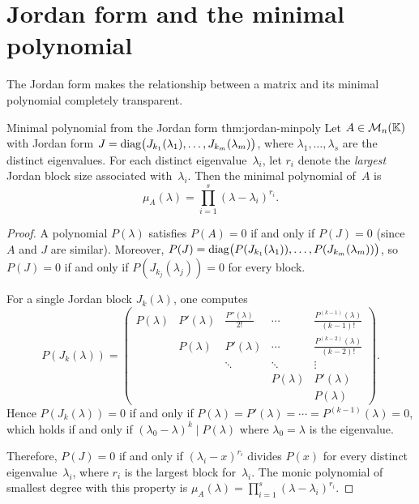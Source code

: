 \section{Jordan form and the minimal polynomial}%
\label{sec:jordan-minpoly}

The Jordan form makes the relationship between a matrix and its minimal
polynomial completely transparent.

\begin{theorem}{Minimal polynomial from the Jordan form}%
{thm:jordan-minpoly}
Let $A \in \mathcal{M}_n({\mathbb{K}})$ with Jordan form
$J = \operatorname{diag}\bigl(J_{k_1}(\lambda_1), \ldots, J_{k_m}(\lambda_m)\bigr)$,
where $\lambda_1, \ldots, \lambda_s$ are the distinct eigenvalues.
For each distinct eigenvalue~$\lambda_i$, let $r_i$ denote the
\emph{largest} Jordan block size associated with~$\lambda_i$.  Then
the minimal polynomial of~$A$ is
\[
  \boxed{\mu_A(\lambda) = \prod_{i=1}^{s}
    (\lambda - \lambda_i)^{r_i}.}
\]
\end{theorem}

\begin{proof}
A polynomial $P(\lambda)$ satisfies $P(A) = 0$ if and only if
$P(J) = 0$ (since $A$ and $J$ are similar).  Moreover,
$P(J) = \operatorname{diag}\bigl(P(J_{k_1}(\lambda_1)), \ldots,
P(J_{k_m}(\lambda_m))\bigr)$, so $P(J) = 0$ if and only if
$P(J_{k_j}(\lambda_j)) = 0$ for every block.

For a single Jordan block $J_k(\lambda)$, one computes
\[
  P(J_k(\lambda)) = \begin{pmatrix}
    P(\lambda) & P'(\lambda) & \frac{P''(\lambda)}{2!} & \cdots
      & \frac{P^{(k-1)}(\lambda)}{(k-1)!} \\
    & P(\lambda) & P'(\lambda) & \cdots
      & \frac{P^{(k-2)}(\lambda)}{(k-2)!} \\
    & & \ddots & \ddots & \vdots \\
    & & & P(\lambda) & P'(\lambda) \\
    & & & & P(\lambda)
  \end{pmatrix}.
\]
Hence $P(J_k(\lambda)) = 0$ if and only if
$P(\lambda) = P'(\lambda) = \cdots = P^{(k-1)}(\lambda) = 0$,
which holds if and only if $(\lambda_0 - \lambda)^k \mid P(\lambda)$
where $\lambda_0 = \lambda$ is the eigenvalue.

Therefore, $P(J) = 0$ if and only if $(\lambda_i - x)^{r_i}$ divides
$P(x)$ for every distinct eigenvalue~$\lambda_i$, where $r_i$ is the
largest block for~$\lambda_i$.  The monic polynomial of smallest degree
with this property is $\mu_A(\lambda) = \prod_{i=1}^s
(\lambda - \lambda_i)^{r_i}$.
\end{proof}

